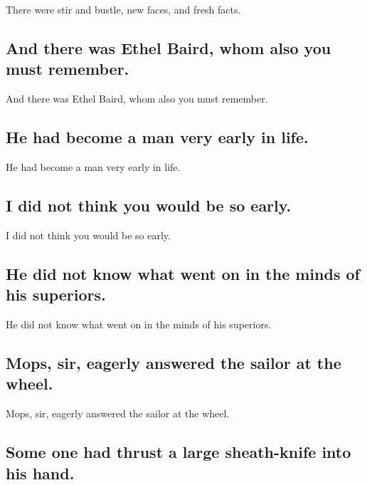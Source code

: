 \documentclass[]{article}
\begin{document}
There were stir and bustle, new faces, and fresh facts.

\hypertarget{and-there-was-ethel-baird-whom-also-you-must-remember.}{%
\subsection{And there was Ethel Baird, whom also you must
remember.}\label{and-there-was-ethel-baird-whom-also-you-must-remember.}}

And there was Ethel Baird, whom also you must remember.

\hypertarget{he-had-become-a-man-very-early-in-life.}{%
\subsection{He had become a man very early in
life.}\label{he-had-become-a-man-very-early-in-life.}}

He had become a man very early in life.

\hypertarget{i-did-not-think-you-would-be-so-early.}{%
\subsection{I did not think you would be so
early.}\label{i-did-not-think-you-would-be-so-early.}}

I did not think you would be so early.

\hypertarget{he-did-not-know-what-went-on-in-the-minds-of-his-superiors.}{%
\subsection{He did not know what went on in the minds of his
superiors.}\label{he-did-not-know-what-went-on-in-the-minds-of-his-superiors.}}

He did not know what went on in the minds of his superiors.

\hypertarget{mops-sir-eagerly-answered-the-sailor-at-the-wheel.}{%
\subsection{Mops, sir, eagerly answered the sailor at the
wheel.}\label{mops-sir-eagerly-answered-the-sailor-at-the-wheel.}}

Mops, sir, eagerly answered the sailor at the wheel.

\hypertarget{some-one-had-thrust-a-large-sheath-knife-into-his-hand.}{%
\subsection{Some one had thrust a large sheath-knife into his
hand.}\label{some-one-had-thrust-a-large-sheath-knife-into-his-hand.}}
\end{document}
